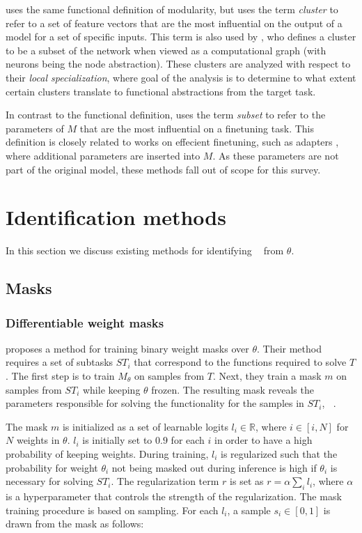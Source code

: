 \documentclass[11pt]{article}
\DeclareMathOperator*{\subnetwork}{\hat{\theta_i}}
\begin{document}
\citet{watanabe2019interpreting} uses the same functional definition of modularity, but uses the term \textit{cluster} to refer to a set of feature vectors that are the most influential on the output of a model for a set of specific inputs. This term is also used by \citet{casper2022graphical}, who defines a cluster to be a subset of the network when viewed as a computational graph (with neurons being the node abstraction). These clusters are analyzed with respect to their \textit{local specialization}, where goal of the analysis is to determine to what extent certain clusters translate to functional abstractions from the target task.

In contrast to the functional definition, \citet{ansell-etal-2022-composable} uses the term \textit{subset} to refer to the parameters of $M$ that are the most influential on a finetuning task. This definition is closely related to works on effecient finetuning, such as adapters \citep{houlsby2019parameter}, where additional parameters are inserted into $M$. As these parameters are not part of the original model, these methods fall out of scope for this survey.

\section{Identification methods}
In this section we discuss existing methods for identifying $\subnetwork$ from $\theta$.
\subsection{Masks}
\subsubsection{Differentiable weight masks}
\citet{csordas2020neural} proposes a method for training binary weight masks over $\theta$. Their method requires a set of subtasks $ST_i$ that correspond to the functions required to solve $T$. The first step is to train $M_\theta$ on samples from $T$.  Next, they train a mask $m$ on samples from $ST_i$ while keeping $\theta$ frozen. The resulting mask reveals the parameters responsible for solving the functionality for the samples in $ST_i$, $\subnetwork$.

The mask $m$ is initialized as a set of learnable logits $l_i \in \mathbb{R}$, where $i \in [i, N]$ for $N$ weights in $\theta$. $l_i$ is initially set to $0.9$ for each $i$ in order to have a high probability of keeping weights. During training, $l_i$ is regularized such that the probability for weight $\theta_i$ not being masked out during inference is high if $\theta_i$ is necessary for solving $ST_i$. The regularization term $r$ is set as $r = \alpha \sum_i l_i$, where $\alpha$ is a hyperparameter that controls the strength of the regularization. The mask training procedure is based on sampling. For each $l_i$, a sample $s_i \in [0, 1]$ is drawn from the mask as follows:
\end{document}
